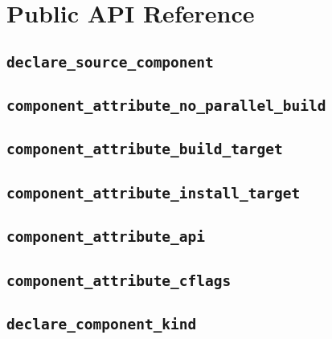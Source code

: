 %
%
%
%
\chapter{Public API Reference}
\section{\texttt{declare\_source\_component}}

\section{\texttt{component\_attribute\_no\_parallel\_build}}\label{api:no-parallel}

\section{\texttt{component\_attribute\_build\_target}}\label{api:build-target}

\section{\texttt{component\_attribute\_install\_target}}\label{api:install-target}

\section{\texttt{component\_attribute\_api}}\label{api:api}

\section{\texttt{component\_attribute\_cflags}}\label{api:cflags}

\section{\texttt{declare\_component\_kind}}\label{api:kind}

